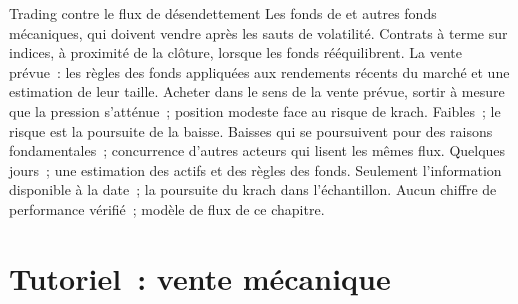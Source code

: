 \begin{strategyfile}{Trading contre le flux de désendettement}\label{strat:s1:volatility-targeting-and-risk-managed-portfolios:against}
 Les fonds de  et autres fonds mécaniques, qui doivent vendre après les sauts de volatilité.
 Contrats à terme sur indices, à proximité de la clôture, lorsque les fonds rééquilibrent.
 La vente prévue~: les règles des fonds appliquées aux rendements récents du marché et une estimation de leur taille.
 Acheter dans le sens de la vente prévue, sortir à mesure que la pression s'atténue~; position modeste face au risque de krach.
 Faibles~; le risque est la poursuite de la baisse.
 Baisses qui se poursuivent pour des raisons fondamentales~; concurrence d'autres acteurs qui lisent les mêmes flux.
 Quelques jours~; une estimation des actifs et des règles des fonds.
 Seulement l'information disponible à la date~; la poursuite du krach dans l'échantillon.
 Aucun chiffre de performance vérifié~; modèle de flux de ce chapitre.
\end{strategyfile}

\section{Tutoriel~: vente mécanique}\label{tut:s1:volatility-targeting-and-risk-managed-portfolios:tut}

